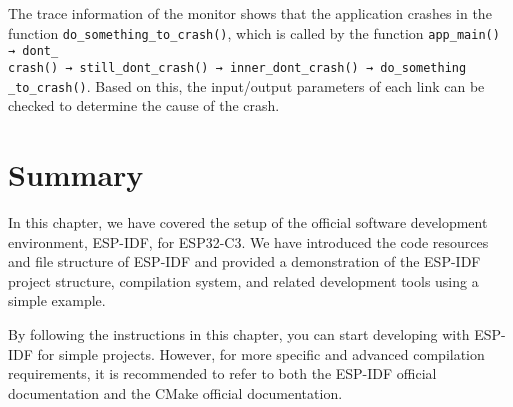 \documentclass[a4paper,12pt]{book}
\begin{document}
The trace information of the monitor shows that the application crashes in the function \verb|do_something_to_crash()|, which is called by the function \verb|app_main() → dont_|\\ \verb|crash() → still_dont_crash() → inner_dont_crash() → do_something|\\ \verb|_to_crash()|. Based on this, the input/output parameters of each link can be checked to determine the cause of the crash.

\section{Summary}
In this chapter, we have covered the setup of the official software development environment, ESP-IDF, for ESP32-C3. We have introduced the code resources and file structure of ESP-IDF and provided a demonstration of the ESP-IDF project structure, compilation system, and related development tools using a simple example.

By following the instructions in this chapter, you can start developing with ESP-IDF for simple projects. However, for more specific and advanced compilation requirements, it is recommended to refer to both the ESP-IDF official documentation and the CMake official documentation.
\end{document}

